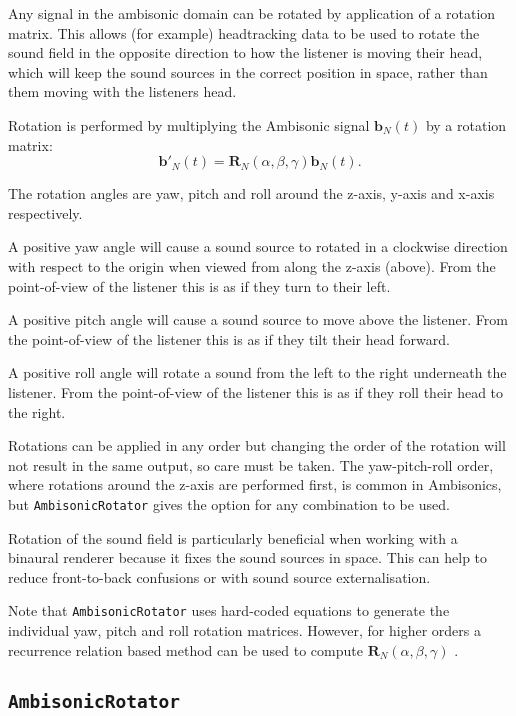 \documentclass[12pt]{report}
\newcommand{\code}[1]{\texttt{#1}}
\begin{document}
Any signal in the ambisonic domain can be rotated by application of a rotation matrix.
This allows (for example) headtracking data to be used to rotate the sound field in the opposite direction to how the listener is moving their head, which will keep the sound sources in the correct position in space, rather than them moving with the listeners head.

Rotation is performed by multiplying the Ambisonic signal $\textbf{b}_{N}(t)$ by a rotation matrix:
\begin{equation}
    \textbf{b}'_{N}(t) = \textbf{R}_{N}(\alpha, \beta, \gamma) \textbf{b}_{N}(t).
\end{equation}

The rotation angles are yaw, pitch and roll around the z-axis, y-axis and x-axis respectively.

A positive yaw angle will cause a sound source to rotated in a clockwise direction with respect to the origin when viewed from along the z-axis (above). From the point-of-view of the listener this is as if they turn to their left.

A positive pitch angle will cause a sound source to move above the listener. From the point-of-view of the listener this is as if they tilt their head forward.

A positive roll angle will rotate a sound from the left to the right underneath the listener. From the point-of-view of the listener this is as if they roll their head to the right.

Rotations can be applied in any order but changing the order of the rotation will not result in the same output, so care must be taken.
The yaw-pitch-roll order, where rotations around the z-axis are performed first, is common in Ambisonics, but \code{AmbisonicRotator} gives the option for any combination to be used.

Rotation of the sound field is particularly beneficial when working with a binaural renderer because it fixes the sound sources in space.
This can help to reduce front-to-back confusions or with sound source externalisation.

Note that \code{AmbisonicRotator} uses hard-coded equations to generate the individual yaw, pitch and roll rotation matrices. However, for higher orders a recurrence relation based method can be used to compute $\textbf{R}_{N}(\alpha, \beta, \gamma)$ \cite{ivanic1996rotation}.

\subsection{\code{AmbisonicRotator}}
\end{document}
